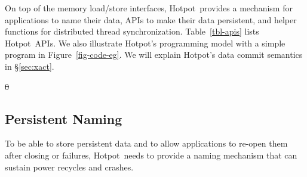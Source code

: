 \documentclass[sigconf]{acmart}
\newcommand{\commitxact}{\textit{commit}}
\newcommand{\commit}{\textit{commit}}
\newcommand{\dsnvm}{DSPM}
\newcommand{\hotpot}{Hotpot}
\providecommand{\DIFdel}[1]{{\protect\color{red}\sout{#1}}}                      %
\providecommand{\DIFaddbegin}{} %
\providecommand{\DIFaddend}{} %
\providecommand{\DIFdelbegin}{} %
\providecommand{\DIFdelend}{} %
\begin{document}
{\DIFaddend On top of the memory load/store interfaces, \hotpot\ provides a mechanism for applications to 
name their data,
APIs to make their data persistent, %
and helper functions for distributed thread synchronization. 
Table~\ref{tbl-apis} lists \hotpot\ APIs.
We also illustrate \hotpot's programming model with a simple program in Figure~\ref{fig-code-eg}.
We will explain \hotpot's data commit semantics in \S\ref{sec:xact}.

\DIFdelbegin %

\DIFdel{0
}%


\DIFdelend \DIFaddbegin \subsection{Persistent Naming}
\DIFaddend \label{sec:naming}
\DIFdelbegin %
\DIFdelend To be able to store persistent data and to allow applications to re-open them after closing or failures, 
\hotpot\ needs to provide a naming mechanism that can sustain power recycles and crashes. 

}
\end{document}
